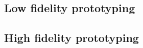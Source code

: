 
\cite{lu2011pubmed, hearst2007biotext}



\cite{bolchini2009better, pavelin2012bioinformatics}


\subsection{Low fidelity prototyping}

\cite{egger2000lofi}



\subsection{High fidelity prototyping}


